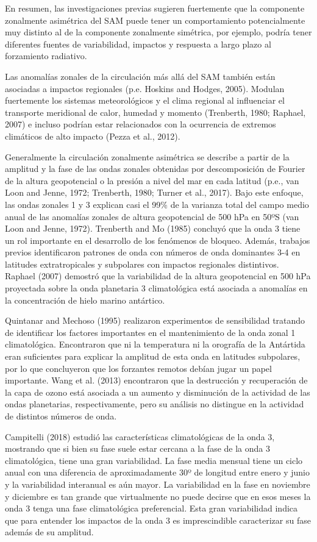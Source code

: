 \documentclass[12pt,oneside]{reedthesis}
\begin{document}
En resumen, las investigaciones previas sugieren fuertemente que la componente zonalmente asimétrica del SAM puede tener un comportamiento potencialmente muy distinto al de la componente zonalmente simétrica, por ejemplo, podría tener diferentes fuentes de variabilidad, impactos y respuesta a largo plazo al forzamiento radiativo.

Las anomalías zonales de la circulación más allá del SAM también están asociadas a impactos regionales (p.e. Hoskins and Hodges, 2005).
Modulan fuertemente los sistemas meteorológicos y el clima regional al influenciar el transporte meridional de calor, humedad y momento (Trenberth, 1980; Raphael, 2007) e incluso podrían estar relacionados con la ocurrencia de extremos climáticos de alto impacto (Pezza et al., 2012).

Generalmente la circulación zonalmente asimétrica se describe a partir de la amplitud y la fase de las ondas zonales obtenidas por descomposición de Fourier de la altura geopotencial o la presión a nivel del mar en cada latitud (p.e., van Loon and Jenne, 1972; Trenberth, 1980; Turner et al., 2017).
Bajo este enfoque, las ondas zonales 1 y 3 explican casi el 99\% de la varianza total del campo medio anual de las anomalías zonales de altura geopotencial de 500 hPa en 50ºS (van Loon and Jenne, 1972).
Trenberth and Mo (1985) concluyó que la onda 3 tiene un rol importante en el desarrollo de los fenómenos de bloqueo.
Además, trabajos previos identificaron patrones de onda con números de onda dominantes 3-4 en latitudes extratropicales y subpolares con impactos regionales distintivos.
Raphael (2007) demostró que la variabilidad de la altura geopotencial en 500 hPa proyectada sobre la onda planetaria 3 climatológica está asociada a anomalías en la concentración de hielo marino antártico.

Quintanar and Mechoso (1995) realizaron experimentos de sensibilidad tratando de identificar los factores importantes en el mantenimiento de la onda zonal 1 climatológica.
Encontraron que ni la temperatura ni la orografía de la Antártida eran suficientes para explicar la amplitud de esta onda en latitudes subpolares, por lo que concluyeron que los forzantes remotos debían jugar un papel importante.
Wang et al. (2013) encontraron que la destrucción y recuperación de la capa de ozono está asociada a un aumento y disminución de la actividad de las ondas planetarias, respectivamente, pero su análisis no distingue en la actividad de distintos números de onda.

Campitelli (2018) estudió las características climatológicas de la onda 3, mostrando que si bien su fase suele estar cercana a la fase de la onda 3 climatológica, tiene una gran variabilidad.
La fase media mensual tiene un ciclo anual con una diferencia de aproximadamente 30º de longitud entre enero y junio y la variabilidad interanual es aún mayor.
La variabilidad en la fase en noviembre y diciembre es tan grande que virtualmente no puede decirse que en esos meses la onda 3 tenga una fase climatológica preferencial.
Esta gran variabilidad indica que para entender los impactos de la onda 3 es imprescindible caracterizar su fase además de su amplitud.
\end{document}
